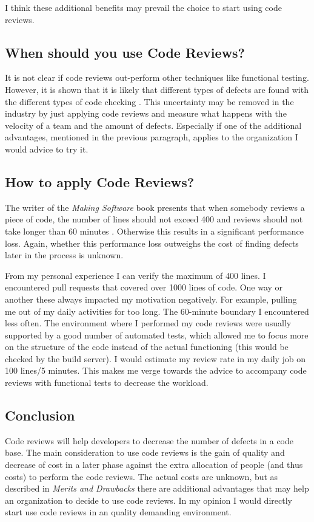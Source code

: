 I think these additional benefits may prevail the choice to start using code reviews.

\subsection*{When should you use Code Reviews?}

It is not clear if code reviews out-perform other techniques like functional testing.
However, it is shown that it is likely that different types of defects are found with the different types of code checking \autocite{Juristo2003}.
This uncertainty may be removed in the industry by just applying code reviews and measure what happens with the velocity of a team and the amount of defects.
Especially if one of the additional advantages, mentioned in the previous paragraph, applies to the organization I would advice to try it.

\subsection*{How to apply Code Reviews?}

The writer of the \textit{Making Software} book presents that when somebody reviews a piece of code,
the number of lines should not exceed 400 and reviews should not take longer than 60 minutes \autocite[330-332]{MAKING_SOFTWARE} \autocite[81]{cohen2006best} \autocite[470--471]{Dunsmore:2000:OIF:337180.337343}.
Otherwise this results in a significant performance loss.
Again, whether this performance loss outweighs the cost of finding defects later in the process is unknown.

From my personal experience I can verify the maximum of 400 lines.
I encountered pull requests that covered over 1000 lines of code.
One way or another these always impacted my motivation negatively.
For example, pulling me out of my daily activities for too long.
The 60-minute boundary I encountered less often.
The environment where I performed my code reviews were usually supported by a good number of automated tests,
which allowed me to focus more on the structure of the code instead of the actual functioning (this would be checked by the build server).
I would estimate my review rate in my daily job on 100 lines/5 minutes.
This makes me verge towards the advice to accompany code reviews with functional tests to decrease the workload.

\subsection*{Conclusion}

Code reviews will help developers to decrease the number of defects in a code base.
The main consideration to use code reviews is the gain of quality and decrease of cost in a later phase against the extra allocation of people (and thus costs) to perform the code reviews.
The actual costs are unknown, but as described in \textit{Merits and Drawbacks} there are additional advantages that may help an organization to decide to use code reviews.
In my opinion I would directly start use code reviews in an quality demanding environment.